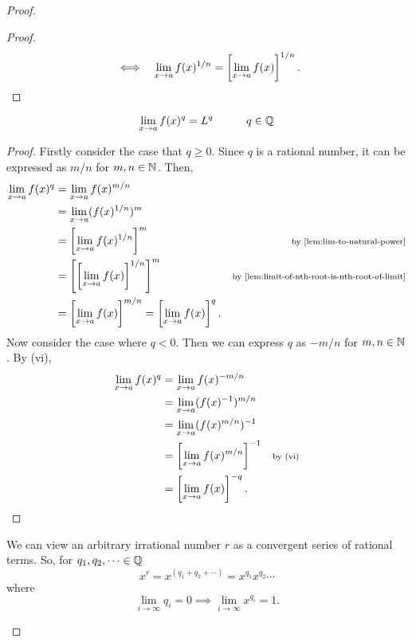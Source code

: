 \documentclass[../MathsNotesBase.tex]{subfiles}
\begin{document}
{\begin{proof}
\begin{enumerate}[label=(\roman*)]
{\begin{proof}
\begin{align*}
						&\iff & \lim_{x \to a} f(x)^{1/n} &= \left[\lim_{x \to a} f(x)\right]^{1/n}. \qedhere \\
						\end{align*}
					\end{proof}
					\begin{lemma}
						\[ \lim_{x \to a} f(x)^q = L^q \hspace{30pt} q \in \mathbb{Q}^{} \]
					\end{lemma}
					\begin{proof}
						Firstly consider the case that ${ q \geq 0 }$. Since $q$ is a rational number, it can be expressed as ${ m/n }$ for ${ m,n \in \mathbb{N}^{} }$. Then,
						\begin{align*}
						\lim_{x \to a} f(x)^q &= \lim_{x \to a} f(x)^{m/n} \\
						&= \lim_{x \to a} (f(x)^{1/n})^m &\sidecomment{} \\
						&= \left[\lim_{x \to a} f(x)^{1/n}\right]^m &\sidecomment{by \autoref{lem:lim-to-natural-power}} \\
						&= \left[\left[\lim_{x \to a} f(x)\right]^{1/n}\right]^m &\sidecomment{by \autoref{lem:limit-of-nth-root-is-nth-root-of-limit}} \\
						&= \left[\lim_{x \to a} f(x)\right]^{m/n} = \left[\lim_{x \to a} f(x)\right]^q.
						\end{align*}
						Now consider the case where ${ q < 0 }$. Then we can express $q$ as ${ -m/n }$ for ${ m,n \in \mathbb{N}^{} }$. By (vi), 
						\begin{align*}
						\lim_{x \to a} f(x)^q &= \lim_{x \to a} f(x)^{-m/n} \\
						&= \lim_{x \to a} (f(x)^{-1})^{m/n} &\text{\scriptsize{}} \\
						&= \lim_{x \to a} (f(x)^{m/n})^{-1} &\text{\scriptsize{}} \\
						&= \left[\lim_{x \to a} f(x)^{m/n}\right]^{-1} &\text{\scriptsize{by (vi)}} \\
						&= \left[\lim_{x \to a} f(x)\right]^{-q}. \qedhere
						\end{align*}
					\end{proof}
					We can view an arbitrary irrational number $r$ as a convergent series of rational terms. So, for ${ q_1,q_2,\dots \in \mathbb{Q}^{} }$
					\[ x^r = x^{(q_1 + q_2 + \cdots)} = x^{q_1}x^{q_2}\cdots \]
					where 
					\[ \lim_{i \to \infty} q_i = 0 \implies \lim_{i \to \infty} x^{q_i} = 1. \]
}
\end{enumerate}
\end{proof}}
\end{document}
